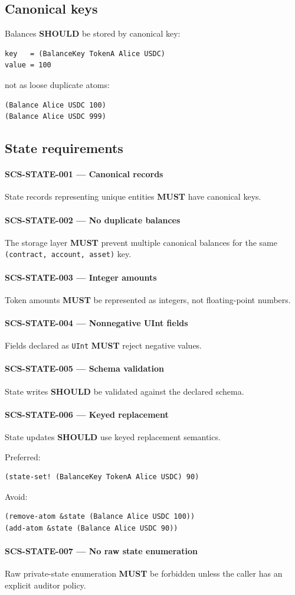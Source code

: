 \documentclass[11pt]{article}
\newcommand{\MUST}{\textbf{MUST}}
\newcommand{\SHOULD}{\textbf{SHOULD}}
\newcommand{\req}[2]{\paragraph{#1}#2\par}
\newcommand{\code}[1]{\texttt{#1}}
\begin{document}
\subsection{Canonical keys}

Balances \SHOULD{} be stored by canonical key:

\begin{lstlisting}
key   = (BalanceKey TokenA Alice USDC)
value = 100
\end{lstlisting}

not as loose duplicate atoms:

\begin{lstlisting}
(Balance Alice USDC 100)
(Balance Alice USDC 999)
\end{lstlisting}

\subsection{State requirements}

\req{SCS-STATE-001 --- Canonical records}{State records representing unique entities \MUST{} have canonical keys.}

\req{SCS-STATE-002 --- No duplicate balances}{The storage layer \MUST{} prevent multiple canonical balances for the same \code{(contract, account, asset)} key.}

\req{SCS-STATE-003 --- Integer amounts}{Token amounts \MUST{} be represented as integers, not floating-point numbers.}

\req{SCS-STATE-004 --- Nonnegative UInt fields}{Fields declared as \code{UInt} \MUST{} reject negative values.}

\req{SCS-STATE-005 --- Schema validation}{State writes \SHOULD{} be validated against the declared schema.}

\req{SCS-STATE-006 --- Keyed replacement}{State updates \SHOULD{} use keyed replacement semantics.}

Preferred:

\begin{lstlisting}
(state-set! (BalanceKey TokenA Alice USDC) 90)
\end{lstlisting}

Avoid:

\begin{lstlisting}
(remove-atom &state (Balance Alice USDC 100))
(add-atom &state (Balance Alice USDC 90))
\end{lstlisting}

\req{SCS-STATE-007 --- No raw state enumeration}{Raw private-state enumeration \MUST{} be forbidden unless the caller has an explicit auditor policy.}
\end{document}
